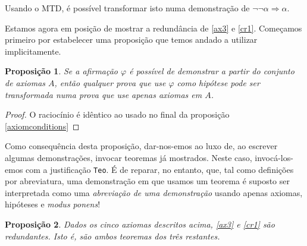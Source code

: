 \documentclass{report}
\newtheorem{prop}{Proposição}
\theoremstyle{definition}
\theoremstyle{remark}
\newcommand{\imply}{\mathbin{\Rightarrow}}
\begin{document}
	Usando o MTD, é possível transformar isto numa demonstração de $\neg\neg\alpha \imply \alpha$.
	
	Estamos agora em posição de mostrar a redundância de \eqref{ax3} e \eqref{cr1}. Começamos primeiro por estabelecer uma proposição que temos andado a utilizar implicitamente.
	
	\begin{prop}
	Se a afirmação $\varphi$ é possível de demonstrar a partir do conjunto de axiomas $A$, então qualquer prova que use $\varphi$ como hipótese pode ser transformada numa prova que use apenas axiomas em $A$.
	\end{prop}
	
	\begin{proof}
	O raciocínio é idêntico ao usado no final da proposição \ref{axiomconditions}
	\end{proof}
	
	Como consequência desta proposição, dar-nos-emos ao luxo de, ao escrever algumas demonstrações, invocar teoremas já mostrados. Neste caso, invocá-los-emos com a justificação \texttt{Teo}. É de reparar, no entanto, que, tal como definições por abreviatura, uma demonstração em que usamos um teorema é suposto ser interpretada como uma \emph{abreviação de uma demonstração} usando apenas axiomas, hipóteses e \textit{modus ponens}!
	
	\begin{prop}
	Dados os cinco axiomas descritos acima, \eqref{ax3} e \eqref{cr1} são redundantes. Isto é, são ambos teoremas dos três restantes.
	\end{prop}
	
\end{document}

